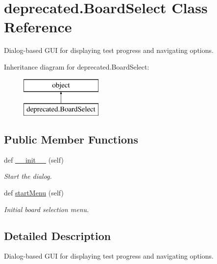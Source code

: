 \hypertarget{classdeprecated_1_1_board_select}{}\section{deprecated.\+Board\+Select Class Reference}
\label{classdeprecated_1_1_board_select}


Dialog-\/based G\+UI for displaying test progress and navigating options.  


Inheritance diagram for deprecated.\+Board\+Select\+:\begin{figure}[H]
\begin{center}
\leavevmode
\includegraphics[height=2.000000cm]{classdeprecated_1_1_board_select}
\end{center}
\end{figure}
\subsection*{Public Member Functions}
\begin{DoxyCompactItemize}
\item 
def \hyperlink{classdeprecated_1_1_board_select_aab94c6c85115ea66c47d0158dfca5659}{\+\_\+\+\_\+init\+\_\+\+\_\+} (self)
\begin{DoxyCompactList}\small\item\em Start the dialog. \end{DoxyCompactList}\item 
def \hyperlink{classdeprecated_1_1_board_select_a00a559c89aa9a4c381a2036ddaebae3b}{start\+Menu} (self)\hypertarget{classdeprecated_1_1_board_select_a00a559c89aa9a4c381a2036ddaebae3b}{}\label{classdeprecated_1_1_board_select_a00a559c89aa9a4c381a2036ddaebae3b}

\begin{DoxyCompactList}\small\item\em Initial board selection menu. \end{DoxyCompactList}\end{DoxyCompactItemize}


\subsection{Detailed Description}
Dialog-\/based G\+UI for displaying test progress and navigating options. 



